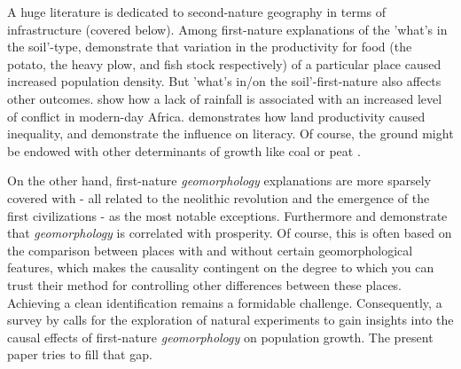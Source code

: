 \documentclass[11pt]{article}
\begin{document}
A huge literature is dedicated to second-nature geography in terms of infrastructure (covered below). Among first-nature explanations of the 'what's in the soil'-type, \cite{Nunn2011a, HeavyPlough2016, Dalgaard2020} demonstrate that variation in the productivity for food (the potato, the heavy plow, and fish stock respectively) of a particular place caused increased population density. But 'what's in/on the soil'-first-nature also affects other outcomes.  \cite{Decet2023WaterWars} show how a lack of rainfall is associated with an increased level of conflict in modern-day Africa. \cite{WinnersAndLosers2022} demonstrates how land productivity caused inequality, and \cite{clark2014} demonstrate the influence on literacy. Of course, the ground might be endowed with other determinants of growth like coal \citep{ORourkeCoal2021} or peat \citep{CoalPeatPaper}. 

On the other hand, first-nature \textit{geomorphology} explanations are more sparsely covered with \cite{Diamond1997, Allen2023, Matranga2024} - all related to the neolithic revolution and the emergence of the first civilizations - as the most notable exceptions. Furthermore \cite{Henderson2018satelite} and \cite{Bosker2017} demonstrate that \textit{geomorphology} is correlated with prosperity. Of course, this is often based on the comparison between places with and without certain geomorphological features, which makes the causality contingent on the degree to which you can trust their method for controlling other differences between these places. Achieving a clean identification remains a formidable challenge. Consequently, a survey by \cite{Bosker2022} calls for the exploration of natural experiments to gain insights into the causal effects of first-nature \textit{geomorphology} on population growth. The present paper tries to fill that gap.
\end{document}
